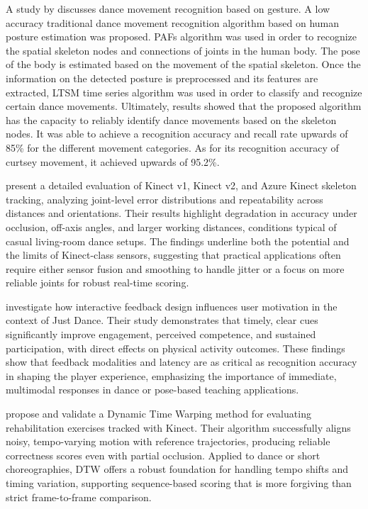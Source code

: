 	A study by \citet{leililiu2023dancemovement} discusses dance movement recognition based on gesture. A low accuracy traditional dance movement recognition algorithm based on human posture estimation was proposed. PAFs algorithm was used in order to recognize the spatial skeleton nodes and connections of joints in the human body. The pose of the body is estimated based on the movement of the spatial skeleton. Once the information on the detected posture is preprocessed and its features are extracted, LTSM time series algorithm was used in order to classify and recognize certain dance movements. Ultimately, results showed that the proposed algorithm has the capacity to reliably identify dance movements based on the skeleton nodes. It was able to achieve a recognition accuracy and recall rate upwards of 85\% for the different movement categories. As for its recognition accuracy of curtsey movement, it achieved upwards of 95.2\%. 



\citet{tolgyessy2021skeletontracking} present a detailed evaluation of Kinect v1, Kinect v2, and Azure Kinect skeleton tracking, analyzing joint-level error distributions and repeatability across distances and orientations. Their results highlight degradation in accuracy under occlusion, off-axis angles, and larger working distances, conditions typical of casual living-room dance setups. The findings underline both the potential and the limits of Kinect-class sensors, suggesting that practical applications often require either sensor fusion and smoothing to handle jitter or a focus on more reliable joints for robust real-time scoring.

\citet{linjustdance} investigate how interactive feedback design influences user motivation in the context of Just Dance. Their study demonstrates that timely, clear cues significantly improve engagement, perceived competence, and sustained participation, with direct effects on physical activity outcomes. These findings show that feedback modalities and latency are as critical as recognition accuracy in shaping the player experience, emphasizing the importance of immediate, multimodal responses in dance or pose-based teaching applications.

\citet{yuxiong2019} propose and validate a Dynamic Time Warping method for evaluating rehabilitation exercises tracked with Kinect. Their algorithm successfully aligns noisy, tempo-varying motion with reference trajectories, producing reliable correctness scores even with partial occlusion. Applied to dance or short choreographies, DTW offers a robust foundation for handling tempo shifts and timing variation, supporting sequence-based scoring that is more forgiving than strict frame-to-frame comparison.


